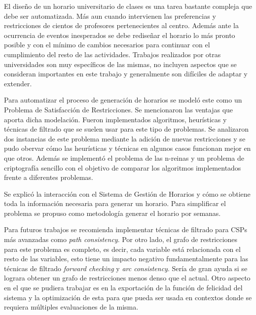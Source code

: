 \begin{conclusions}

El diseño de un horario universitario de clases es una tarea bastante compleja que debe ser automatizada. M\'as aun cuando intervienen las preferencias y restricciones de cientos de profesores pertenecientes al centro. Adem\'as ante la ocurrencia de eventos inesperados se debe rediseñar el horario lo m\'as pronto posible y con el m\'inimo de cambios necesarios para continuar con el cumplimiento del resto de las actividades. Trabajos realizados por otras universidades son muy espec\'ificos de las mismas, no incluyen aspectos que se consideran importantes en este trabajo y generalmente son dif\'iciles de adaptar y extender.

Para automatizar el proceso de generaci\'on de horarios se model\'o este como un Problema de Satisfacci\'on de Restricciones. Se mencionaron las ventajas que aporta dicha modelaci\'on. Fueron implementados algoritmos, heur\'isticas y t\'ecnicas de filtrado que se suelen usar para este tipo de problemas. Se analizaron dos instancias de este problema mediante la adici\'on de nuevas restricciones y se pudo obervar c\'omo las heur\'isticas y t\'ecnicas en algunos casos funcionan mejor en que otros. Adem\'as se implement\'o el problema de las n-reinas y un problema de criptograf\'ia sencillo con el objetivo de comparar los algoritmos implementados frente a diferentes problemas.

Se explic\'o la interacci\'on con el Sistema de Gesti\'on de Horarios y c\'omo se obtiene toda la informaci\'on necesaria para generar un horario. Para simplificar el problema se propuso como metodolog\'ia generar el horario por semanas.

Para futuros trabajos se recomienda implementar t\'ecnicas de filtrado para CSPs m\'as avanzadas como \emph{path consistency}. Por otro lado, el grafo de restricciones para este problema es completo, es decir, cada variable est\'a relacionada con el resto de las variables, esto tiene un impacto negativo fundamentalmente para las t\'ecnicas de filtrado \emph{forward checking} y \emph{arc consistency}. Ser\'ia de gran ayuda si se lograra obtener un grafo de restricciones menos denso que el actual. Otro aspecto en el que se pudiera trabajar es en la exportaci\'on de la funci\'on de felicidad del sistema y la optimizaci\'on de esta para que pueda ser usada en contextos donde se requiera m\'ultiples evaluaciones de la misma.

\end{conclusions}